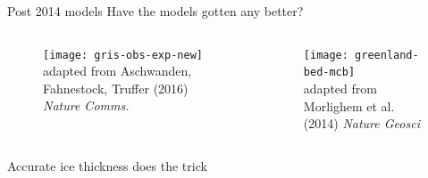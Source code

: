 \documentclass[hide notes,intlimits]{beamer}
\begin{document}
\begin{frame}{Post 2014 models}
  \alert{Have the models gotten any better?}
  \begin{columns}[c]
    \begin{column}{.6\linewidth}
    \begin{figure}
      \texttt{[image: gris-obs-exp-new]}
      \\ \tiny{adapted from Aschwanden, Fahnestock, Truffer (2016) \textit{Nature Comms.}}
    \end{figure}
    \end{column}
    \begin{column}{.4\linewidth}
      \begin{figure}
        \texttt{[image: greenland-bed-mcb]}
      \\ \tiny{adapted from Morlighem et al. (2014) \textit{Nature Geosci}}
      \end{figure}
    \end{column}
  \end{columns}
  \alert{Accurate ice thickness does the trick}
  
\end{frame}
\end{document}
